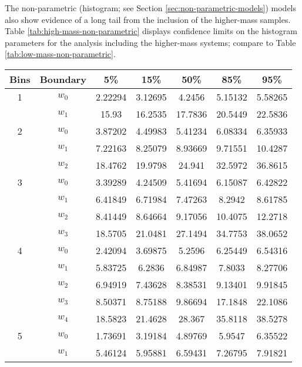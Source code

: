 \documentclass[preprint]{aastex}
\begin{document}
The non-parametric (histogram; see Section \ref{sec:non-parametric-models}) models
also show evidence of a long tail from the inclusion of the
higher-mass samples.  Table \ref{tab:high-mass-non-parametric}
displays confidence limits on the histogram parameters for the
analysis including the higher-mass systems; compare to Table
\ref{tab:low-mass-non-parametric}.

\begin{table}
  \begin{center}
    \begin{tabular}{|c|c|c|c|c|c|c|}
      \hline
      Bins & Boundary & 5\% & 15\% & 50\% & 85\% & 95\% \\
      \hline \hline
      \hline
      1 & $w_0$ & 2.22294 & 3.12695 & 4.2456 & 5.15132 & 5.58265 \\
      \hline
      & $w_1$ & 15.93 & 16.2535 & 17.7836 & 20.5449 & 22.5836 \\
      \hline \hline
      2 & $w_0$ & 3.87202 & 4.49983 & 5.41234 & 6.08334 & 6.35933 \\
      \hline
      & $w_1$ & 7.22163 & 8.25079 & 8.93669 & 9.71551 & 10.4287 \\
      \hline
      & $w_2$ & 18.4762 & 19.9798 & 24.941 & 32.5972 & 36.8615 \\
      \hline \hline
      3 & $w_0$ & 3.39289 & 4.24509 & 5.41694 & 6.15087 & 6.42822 \\
      \hline
      & $w_1$ & 6.41849 & 6.71984 & 7.47263 & 8.2942 & 8.61785 \\
      \hline
      & $w_2$ & 8.41449 & 8.64664 & 9.17056 & 10.4075 & 12.2718 \\
      \hline
      & $w_3$ & 18.5705 & 21.0481 & 27.1494 & 34.7753 & 38.0652 \\
      \hline \hline
      4 & $w_0$ & 2.42094 & 3.69875 & 5.2596 & 6.25449 & 6.54316 \\
      \hline
      & $w_1$ & 5.83725 & 6.2836 & 6.84987 & 7.8033 & 8.27706 \\
      \hline
      & $w_2$ & 6.94919 & 7.43628 & 8.38531 & 9.13401 & 9.91845 \\
      \hline
      & $w_3$ & 8.50371 & 8.75188 & 9.86694 & 17.1848 & 22.1086 \\
      \hline
      & $w_4$ & 18.5823 & 21.4628 & 28.367 & 35.8118 & 38.5278 \\      
      \hline \hline
      5 & $w_0$ & 1.73691 & 3.19184 & 4.89769 & 5.9547 & 6.35522 \\
      \hline
      & $w_1$ & 5.46124 & 5.95881 & 6.59431 & 7.26795 & 7.91821 \\

\end{tabular}
\end{center}
\end{table}
\end{document}
